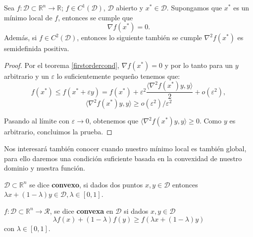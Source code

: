 \begin{theorem}\label{firstsecondordercond}
    Sea  $f: \mathcal{D} \subset \mathbb{R}^n \to \mathbb{R}$; $f \in C^1(\mathcal{D})$, $\mathcal{D}$ abierto y $x^* \in \mathcal{D}$. Supongamos que $x^*$ es un mínimo local de $f$, entonces se cumple que
    \begin{equation}
        \nabla f(x^*) = 0.
    \end{equation}
     Además, si $f \in C^2(\mathcal{D})$, entonces lo siguiente también se cumple $\nabla^2 f(x^*)$ es semidefinida positiva.
\end{theorem}

\begin{proof}
    Por el teorema \ref{firstordercond}, $\nabla f(x^*)=0$ y por lo tanto para un $y$ arbitrario y un $\varepsilon$ lo suficientemente pequeño tenemos que:
    \begin{equation}
        f(x^*) \le f(x^* + \varepsilon y) = f(x^*) + \varepsilon^2 \frac{\langle \nabla^2 f(x^*)y, y \rangle}{2} + o(\varepsilon^2),
    \end{equation}
    \begin{equation}
        \langle \nabla^2 f(x^*)y, y \rangle \ge o(\varepsilon^2)/\varepsilon^2
    \end{equation}

    Pasando al límite con $\varepsilon \to 0$, obtenemos que $\langle \nabla^2 f(x^*)y, y \rangle \ge 0$. Como $y$ es arbitrario, concluimos la prueba. 
\end{proof}

Nos interesará también conocer cuando nuestro mínimo local es también global, para ello daremos una condición suficiente basada en la convexidad de nuestro dominio y nuestra función.

\begin{definition}
    $\mathcal{D} \subset \mathbb{R}^n$ se dice \textbf{convexo}, si dados dos puntos $x, y \in \mathcal{D}$ entonces $\lambda x + (1 - \lambda)y \in \mathcal{D}, \lambda \in [0, 1]$.
\end{definition}

\begin{definition}
    $f: \mathcal{D} \subset \mathbb{R}^n \to \mathcal{R}$, se dice \textbf{convexa} en $\mathcal{D}$ si dados $x, y \in \mathcal{D}$
    \begin{equation}
        \lambda f(x) + (1- \lambda)f(y) \ge f(\lambda x + (1-\lambda) y)
    \end{equation}
    con $\lambda \in [0, 1]$.
\end{definition}

